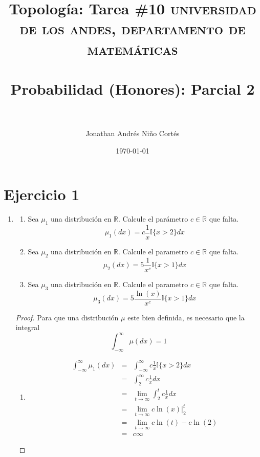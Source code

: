 \documentclass[paper=letter, fontsize=11pt]{scrartcl} %
\title{Topología: Tarea \#10}
\title{	
\normalfont \normalsize 
\textsc{universidad de los andes, departamento de matemáticas} \\ [25pt] %
\horrule{0.5pt} \\[0.4cm] %
\huge Probabilidad (Honores): Parcial 2 \\ %
\horrule{2pt} \\[0.5cm] %
}
\author{Jonathan Andrés Niño Cortés} %
\date{\normalsize\today} %
\numberwithin{equation}{section} %
\numberwithin{figure}{section} %
\numberwithin{table}{section} %
\begin{document}
\maketitle

\section{Ejercicio 1}

\begin{enumerate}[label = \Alph*)]
\item \begin{enumerate}[label = \arabic*)]
\item Sea $ \mu_1 $ una distribución en $ \mathbb{R} $. Calcule el parámetro $ c \in \mathbb{R} $ que falta.
\begin{equation}
\mu_1(dx)=c\frac{1}{x}\mathbb{I}\{x>2\}dx \nonumber
\end{equation}

\item Sea $ \mu_2 $ una distribución en $ \mathbb{R} $. Calcule el parametro $ c \in \mathbb{R} $ que falta.
\begin{equation}
\mu_2(dx)=5\frac{1}{x^c}\mathbb{I}\{x>1\}dx \nonumber
\end{equation}

\item Sea $ \mu_3 $ una distribución en $ \mathbb{R} $. Calcule el parametro $ c \in \mathbb{R} $ que falta.
\begin{equation}
\mu_3(dx)=5\frac{\ln(x)}{x^c}\mathbb{I}\{x>1\}dx \nonumber
\end{equation}
\end{enumerate}

\begin{proof}
Para que una distribución $  \mu $ este bien definida, es necesario que la integral
\begin{equation}
\int_{-\infty}^{\infty}\mu(dx)=1 \nonumber
\end{equation}

\begin{enumerate}[label = \arabic*)]
\item 
\begin{eqnarray}
\int_{-\infty}^{\infty}\mu_1(dx) &=& \int_{-\infty}^{\infty} c\frac{1}{x}\mathbb{I}\{x>2\}dx \nonumber
\\ &=& \int_{2}^{\infty} c\frac{1}{x}dx \nonumber
\\ &=& \lim_{t \to \infty} \int_{2}^{t} c\frac{1}{x}dx \nonumber
\\ &=& \lim_{t \to \infty} c\ln(x)\bigg |_{2}^t \nonumber
\\ &=& \lim_{t \to \infty} c\ln(t)-c\ln(2) \nonumber
\\ &=& c\infty \nonumber
\end{eqnarray}


\end{enumerate}
\end{proof}
\end{enumerate}
\end{document}
